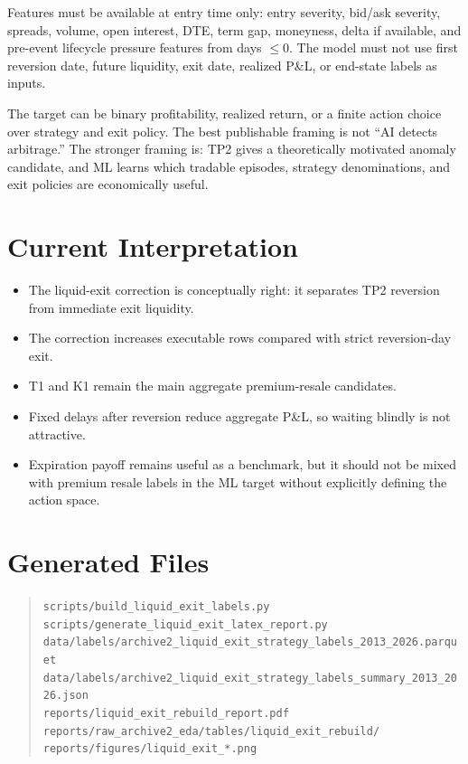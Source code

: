 \documentclass[11pt]{article}
\begin{document}
Features must be available at entry time only: entry severity, bid/ask severity, spreads, volume,
open interest, DTE, term gap, moneyness, delta if available, and pre-event lifecycle pressure
features from days \(\le 0\). The model must not use first reversion date, future liquidity, exit
date, realized P\&L, or end-state labels as inputs.

The target can be binary profitability, realized return, or a finite action choice over strategy and
exit policy. The best publishable framing is not ``AI detects arbitrage.'' The stronger framing is:
TP2 gives a theoretically motivated anomaly candidate, and ML learns which tradable episodes,
strategy denominations, and exit policies are economically useful.

\section{Current Interpretation}

\begin{itemize}
  \item The liquid-exit correction is conceptually right: it separates TP2 reversion from immediate
  exit liquidity.
  \item The correction increases executable rows compared with strict reversion-day exit.
  \item T1 and K1 remain the main aggregate premium-resale candidates.
  \item Fixed delays after reversion reduce aggregate P\&L, so waiting blindly is not attractive.
  \item Expiration payoff remains useful as a benchmark, but it should not be mixed with premium
  resale labels in the ML target without explicitly defining the action space.
\end{itemize}

\section{Generated Files}

\begin{quote}\small
\texttt{scripts/build\_liquid\_exit\_labels.py}\\
\texttt{scripts/generate\_liquid\_exit\_latex\_report.py}\\
\texttt{data/labels/archive2\_liquid\_exit\_strategy\_labels\_2013\_2026.parquet}\\
\texttt{data/labels/archive2\_liquid\_exit\_strategy\_labels\_summary\_2013\_2026.json}\\
\texttt{reports/liquid\_exit\_rebuild\_report.pdf}\\
\texttt{reports/raw\_archive2\_eda/tables/liquid\_exit\_rebuild/}\\
\texttt{reports/figures/liquid\_exit\_*.png}
\end{quote}
\end{document}

